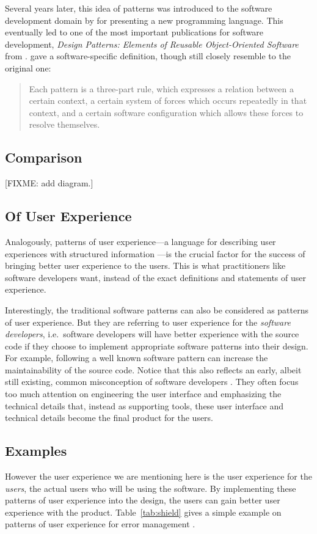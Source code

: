 \documentclass{acm_proc_article-sp}
\begin{document}
Several years later, this idea of patterns was introduced to the
software development domain by \citet{patterns:beck} for presenting a
new programming language. This eventually led to one of the most
important publications for software development, \textit{Design
  Patterns: Elements of Reusable Object-Oriented Software} from
\citet{patterns:gamma}. \citet{timeless:gabriel} gave a
software-specific definition, though still closely resemble to the
original one:
\begin{quote}
Each pattern is a three-part rule, which expresses a relation between
a certain context, a certain system of forces which occurs repeatedly
in that context, and a certain software configuration which allows
these forces to resolve themselves.
\end{quote}

\subsection{Comparison}
[FIXME: add diagram.]

\subsection{Of User Experience}
Analogously, patterns of user experience---a language for describing
user experiences with structured information
\citep{pux:blackwell}---is the crucial factor for the success of
bringing better user experience to the users. This is what
practitioners like software developers want, instead of the exact
definitions and statements of user experience.

Interestingly, the traditional software patterns can also be
considered as patterns of user experience. But they are referring to
user experience for the \textit{software developers}, i.e.\ software
developers will have better experience with the source code if they
choose to implement appropriate software patterns into their
design. For example, following a well known software pattern can
increase the maintainability of the source code. Notice that this also
reflects an early, albeit still existing, common misconception of
software developers \citep{pux:blackwell}. They often focus too much
attention on engineering the user interface and emphasizing the
technical details that, instead as supporting tools, these user
interface and technical details become the final product for the
users.

\subsection{Examples}
However the user experience we are mentioning here is the user
experience for the \textit{users}, the actual users who will be using
the software. By implementing these patterns of user experience into
the design, the users can gain better user experience with the
product. Table~\ref{tab:shield} gives a simple example on patterns of
user experience for error management \citep{patterns:welie}.
\end{document}
